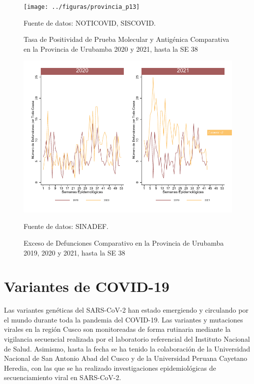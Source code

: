 \documentclass[12pt,a4paper,openany]{book}
\begin{document}
	\begin{figure}[h]
	\caption{Tasa de Positividad de Prueba Molecular y Antigénica Comparativa en la Provincia de Urubamba 2020 y 2021, hasta la SE 38}\label{fig:positividad_urub}
	\begin{center}
		\texttt{[image: ../figuras/provincia\_p13]}
	\end{center}
	{\footnotesize {Fuente de datos: NOTICOVID, SISCOVID.}}
	\end{figure}

	\begin{figure}[h]
	\caption{Exceso de Defunciones Comparativo en la Provincia de Urubamba 2019, 2020 y 2021, hasta la SE 38}\label{fig:exceso_urub}
	\begin{center}
		\includegraphics[width=0.7\linewidth]{../figuras/exceso_13}
	\end{center}
	{\footnotesize {Fuente de datos: SINADEF.}}
	\end{figure}
	\chapter*{Variantes de COVID-19}
	\noindent Las variantes genéticas del SARS-CoV-2 han estado emergiendo y circulando por el mundo durante toda la pandemia del COVID-19. Las variantes y mutaciones virales en la región Cusco son monitoreadas de forma rutinaria mediante la vigilancia secuencial realizada por el laboratorio referencial del Instituto Nacional de Salud. Asimismo, hasta la fecha se ha tenido la colaboración de la Universidad Nacional de San Antonio Abad del Cusco y de la Universidad Peruana Cayetano Heredia, con las que se ha realizado investigaciones epidemiológicas de secuenciamiento viral en SARS-CoV-2.
	
\end{document}
